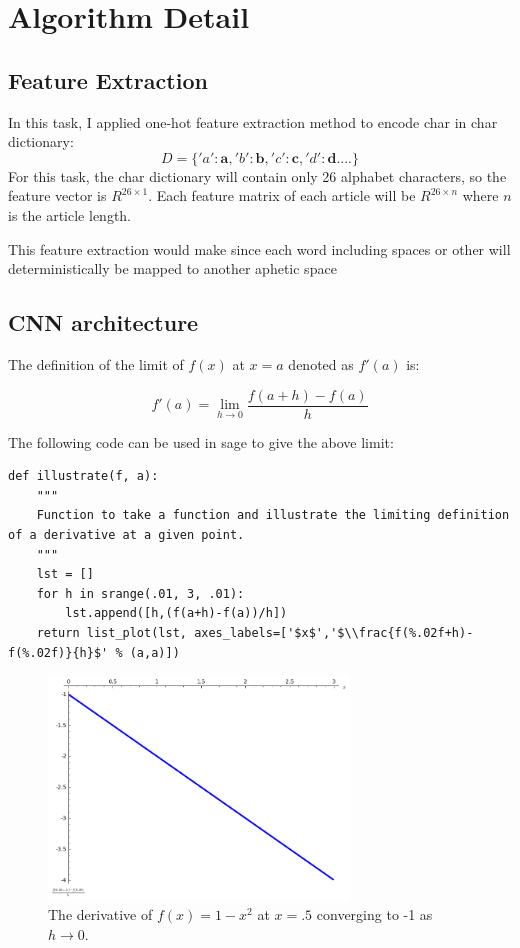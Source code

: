 \documentclass[a4paper]{article}
\begin{document}
\section{Algorithm Detail}\label{algoDetail}

\subsection{Feature Extraction}
In this task, I applied one-hot feature extraction method to encode char in char dictionary:
\begin{equation}
D = \{'a': \mathbf{a},'b': \mathbf{b},'c': \mathbf{c},'d': \mathbf{d}....\}
\end{equation}
For this task, the char dictionary will contain only 26 alphabet characters, so the feature vector is $R^{26 \times 1}$. Each feature matrix of each article will be $R^{26 \times n}$ where $n$ is the article length.

This feature extraction would make since each word including spaces or other will deterministically be mapped to another aphetic space 

\subsection{CNN architecture}

The definition of the limit of $f(x)$ at $x=a$ denoted as $f'(a)$ is:

\begin{equation}
f'(a) = \lim_{h\to0}\frac{f(a+h)-f(a)}{h}
\end{equation}

The following code can be used in sage to give the above limit:

\begin{verbatim}
def illustrate(f, a):
    """
    Function to take a function and illustrate the limiting definition of a derivative at a given point.
    """
    lst = []
    for h in srange(.01, 3, .01):
    	lst.append([h,(f(a+h)-f(a))/h])
    return list_plot(lst, axes_labels=['$x$','$\\frac{f(%.02f+h)-f(%.02f)}{h}$' % (a,a)])
\end{verbatim}

\begin{figure}[!htbp]
\begin{center}
\includegraphics[width=8cm]{sage1.png}
\end{center}
\caption{The derivative of $f(x)=1-x^2$ at $x=.5$ converging to -1 as $h\to0$.}
\end{figure}
\end{document}
